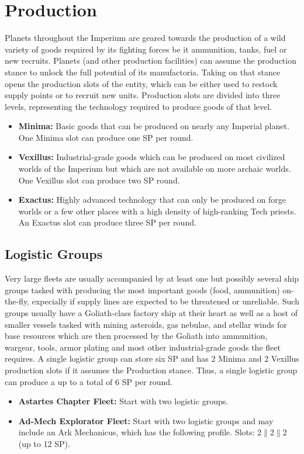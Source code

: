\section{Production}
Planets throughout the Imperium are geared towards the production of a wild variety of goods required by its fighting forces be it ammunition, tanks, fuel or new recruits.
Planets (and other production facilities) can assume the production stance to unlock the full potential of its manufactoria.
Taking on that stance opens the production slots of the entity, which can be either used to restock supply points or to recruit new units.
Production slots are divided into three levels, representing the technology required to produce goods of that level.
\begin{itemize}
	\item \textbf{Minima:} Basic goods that can be produced on nearly any Imperial planet. One Minima slot can produce one SP per round.
	\item \textbf{Vexillus:} Industrial-grade goods which can be produced on most civilized worlds of the Imperium but which are not available on more archaic worlds.	One Vexillus slot can produce two SP round.
	\item \textbf{Exactus:} Highly advanced technology that can only be produced on forge worlds or a few other places with a high density of high-ranking Tech priests. An Exactus slot can produce three SP per round.
\end{itemize}

\subsection{Logistic Groups}
Very large fleets are usually accompanied by at least one but possibly several ship groups tasked with producing the most important goods (food, ammunition) on-the-fly, expecially if supply lines are expected to be threatened or unreliable. 
Such groups usually have a Goliath-class factory ship at their heart as well as a host of smaller vessels tasked with mining asteroids, gas nebulae, and stellar winds for base resources which are then processed by the Goliath into ammunition, wargear, tools, armor plating and most other industrial-grade goods the fleet requires. \newline
A single logistic group can store six SP and has 2 Minima and 2 Vexillus production slots if it assumes the Production stance. Thus, a single logistic group can produce a up to a total of 6 SP per round.
\begin{itemize}
	\item \textbf{Astartes Chapter Fleet:} Start with two logistic groups.
	\item \textbf{Ad-Mech Explorator Fleet:} Start with two logistic groups and may include an Ark Mechanicus, which has the following profile. Slots: 2$\|$2$\|$2 (up to 12 SP).
\end{itemize}

